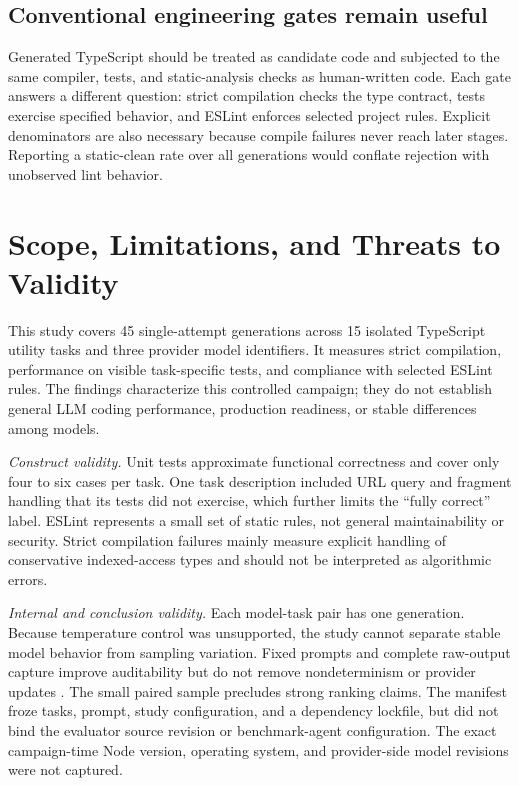 \documentclass[conference]{IEEEtran}
\begin{document}
\subsection{Conventional engineering gates remain useful}
Generated TypeScript should be treated as candidate code and subjected to the same compiler, tests, and static-analysis checks as human-written code. Each gate answers a different question: strict compilation checks the type contract, tests exercise specified behavior, and ESLint enforces selected project rules. Explicit denominators are also necessary because compile failures never reach later stages. Reporting a static-clean rate over all generations would conflate rejection with unobserved lint behavior.

\section{Scope, Limitations, and Threats to Validity}
This study covers 45 single-attempt generations across 15 isolated TypeScript utility tasks and three provider model identifiers. It measures strict compilation, performance on visible task-specific tests, and compliance with selected ESLint rules. The findings characterize this controlled campaign; they do not establish general LLM coding performance, production readiness, or stable differences among models.

\textit{Construct validity.} Unit tests approximate functional correctness and cover only four to six cases per task. One task description included URL query and fragment handling that its tests did not exercise, which further limits the ``fully correct'' label. ESLint represents a small set of static rules, not general maintainability or security. Strict compilation failures mainly measure explicit handling of conservative indexed-access types and should not be interpreted as algorithmic errors.

\textit{Internal and conclusion validity.} Each model-task pair has one generation. Because temperature control was unsupported, the study cannot separate stable model behavior from sampling variation. Fixed prompts and complete raw-output capture improve auditability but do not remove nondeterminism or provider updates \cite{mastropaolo2023robustness,ouyang2025nondeterminism}. The small paired sample precludes strong ranking claims. The manifest froze tasks, prompt, study configuration, and a dependency lockfile, but did not bind the evaluator source revision or benchmark-agent configuration. The exact campaign-time Node version, operating system, and provider-side model revisions were not captured.
\end{document}
